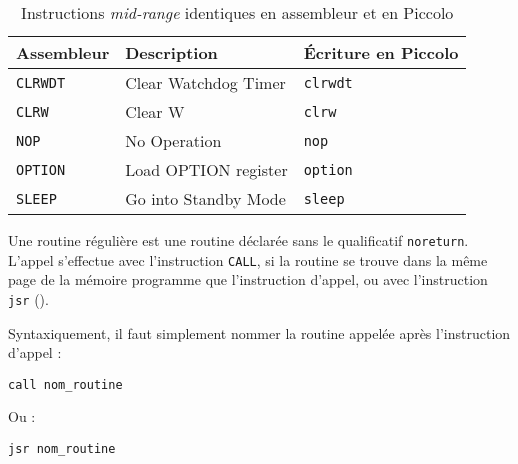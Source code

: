 \begin{table}[!ht]
  \centering
  \small
  \begin{tabular}{lll}
    \textbf{Assembleur} & \textbf{Description} & \textbf{Écriture en Piccolo}\\
    \hline
    \texttt{CLRWDT} & Clear Watchdog Timer & \texttt{clrwdt}\\
    \texttt{CLRW} & Clear W & \texttt{clrw}\\
    \texttt{NOP} & No Operation & \texttt{nop}\\
    \texttt{OPTION} & Load OPTION register & \texttt{option}\\
    \texttt{SLEEP} & Go into Standby Mode & \texttt{sleep}\\
    \hline
  \end{tabular}
  \caption{Instructions \emph{mid-range} identiques en assembleur et en Piccolo}
\end{table}




























Une routine régulière est une routine déclarée sans le qualificatif \texttt{noreturn}. L'appel s’effectue avec l'instruction \texttt{CALL}, si la routine se trouve dans la même page de la mémoire programme que l'instruction d'appel, ou avec l'instruction \texttt{jsr} ().

Syntaxiquement, il faut simplement nommer la routine appelée après l’instruction d’appel :

\begin{lstlisting}[language=piccolo]
call nom_routine
\end{lstlisting}

Ou :

\begin{lstlisting}[language=piccolo]
jsr nom_routine
\end{lstlisting}





